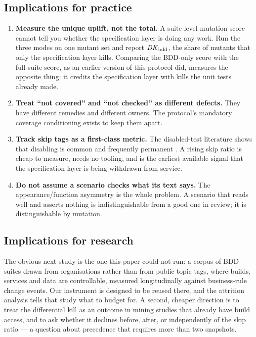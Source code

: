 \subsection{Implications for practice}

\begin{enumerate}
\item \textbf{Measure the unique uplift, not the total.} A suite-level mutation score cannot tell you
      whether the specification layer is doing any work. Run the three modes on one mutant set and
      report $\mathit{DK}_{\mathrm{bdd}}$, the share of mutants that only the specification layer kills. Comparing the
      BDD-only score with the full-suite score, as an earlier version of this protocol did, measures
      the opposite thing: it credits the specification layer with kills the unit tests already made.
\item \textbf{Treat ``not covered'' and ``not checked'' as different defects.} They have different
      remedies and different owners. The protocol's mandatory coverage conditioning exists to keep them
      apart.
\item \textbf{Track skip tags as a first-class metric.} The disabled-test literature shows that
      disabling is common and frequently permanent \citep{Kim2021Disabled}. A rising skip ratio is
      cheap to measure, needs no tooling, and is the earliest available signal that the specification
      layer is being withdrawn from service.
\item \textbf{Do not assume a scenario checks what its text says.} The appearance/function asymmetry is
      the whole problem. A scenario that reads well and asserts nothing is indistinguishable from a
      good one in review; it is distinguishable by mutation.
\end{enumerate}

\subsection{Implications for research}

The obvious next study is the one this paper could not run: a corpus of BDD suites drawn from
organisations rather than from public topic tags, where builds, services and data are controllable,
measured longitudinally against business-rule change events. Our instrument is designed to be reused
there, and the attrition analysis tells that study what to budget for. A second, cheaper direction is
to treat the differential kill as an outcome in mining studies that already have build access, and to
ask whether it declines before, after, or independently of the skip ratio --- a question about
precedence that requires more than two snapshots.

